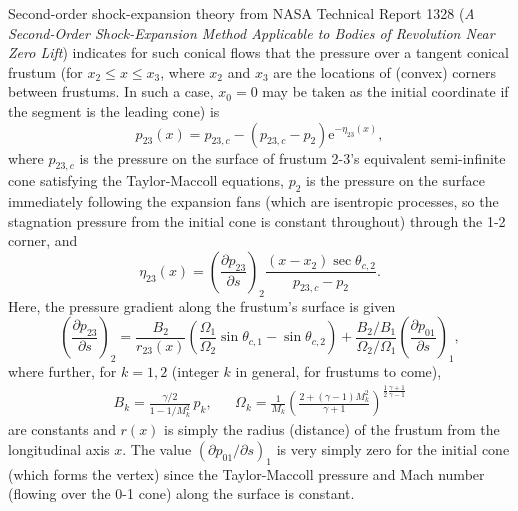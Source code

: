 \documentclass[11pt,dvipsnames]{thesis}
\begin{document}
Second-order shock-expansion theory from NASA Technical Report 1328 (\textit{A Second-Order Shock-Expansion Method Applicable to Bodies of Revolution Near Zero Lift}) indicates for such conical flows that the pressure over a tangent conical frustum (for $x_2 \leqslant x \leqslant x_3$, where $x_2$ and $x_3$ are the locations of (convex) corners between frustums. In such a case, $x_0 = 0$ may be taken as the initial coordinate if the segment is the leading cone) is
\begin{equation}
p_{23}(x) = p_{23,c} - (p_{23,c} - p_2) \mathrm{e}^{-\eta_{23}(x)}, \label{eq:AerodynamicsSecondOrderp23}
\end{equation}
where $p_{23,c}$ is the pressure on the surface of frustum 2-3's equivalent semi-infinite cone satisfying the Taylor-Maccoll equations, $p_2$ is the pressure on the surface immediately following the expansion fans (which are isentropic processes, so the stagnation pressure from the initial cone is constant throughout) through the 1-2 corner, and
\begin{equation}
\eta_{23}(x) = \left(\frac{\partial p_{23}}{\partial s}\right)_{\!2} \frac{(x - x_2)\sec\theta_{c,2}}{p_{23,c} - p_2}.
\end{equation}
Here, 
the pressure gradient along the frustum's surface is given
\begin{equation}
\left(\frac{\partial p_{23}}{\partial s}\right)_{\!2} = \frac{B_2}{r_{23}(x)}\left(\frac{\Omega_1}{\Omega_2} \sin\theta_{c,1} - \sin\theta_{c,2}\right) + \frac{B_2 / B_1}{\Omega_2 / \Omega_1}\left(\frac{\partial p_{01}}{\partial s}\right)_{\!1},
\end{equation}
where further, for $k = 1,2$ (integer $k$ in general, for frustums to come),
\begin{align}
B_k = \frac{\gamma / 2}{1 - 1 / M_k^2} \,p_k, && \Omega_k = \frac{1}{M_k}\left(\frac{2 + (\gamma - 1)M_k^2}{\gamma + 1}\right)^{\!\frac{1}{2}\frac{\gamma + 1}{\gamma - 1}} \label{eq:AerodynamicsSecondOrderBandOmega}
\end{align}
are constants and $r(x)$ is simply the radius (distance) of the frustum from the longitudinal axis $x$. The value $(\partial p_{01} / \partial s)_1$ is very simply zero for the initial cone (which forms the vertex) since the Taylor-Maccoll pressure and Mach number (flowing over the 0-1 cone) along the surface is constant. 
\end{document}
